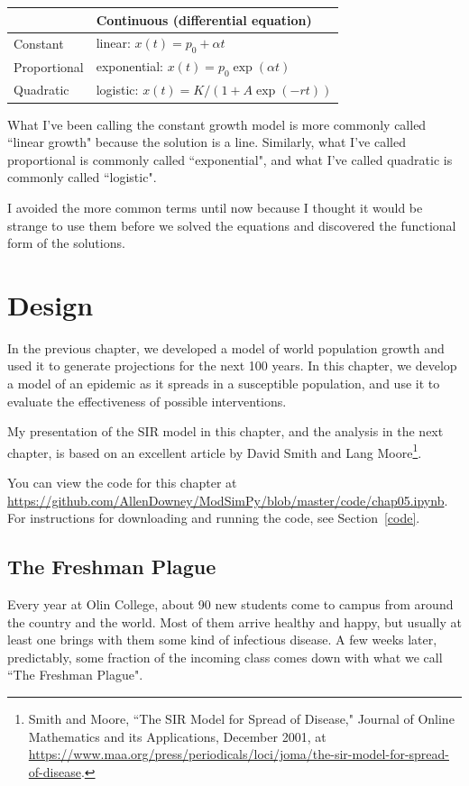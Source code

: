 \documentclass[12pt]{book}
\theoremstyle{exercise}
\begin{document}
\begin{tabular}{l|l} 
\hline
        & Continuous (differential equation) \\ 
\hline 
Constant & linear: $x(t) = p_0 + \alpha t$ \\ 
 
Proportional & exponential: $x(t) = p_0 \exp(\alpha t)$ \\ 
 
Quadratic & logistic: $x(t) = K / (1 + A\exp(-rt))$ \\ 
\end{tabular} 

What I've been calling the constant growth model is more commonly called ``linear growth" because the solution is a line.  Similarly, what I've called proportional is commonly called ``exponential", and what I've called quadratic is commonly called ``logistic".

I avoided the more common terms until now because I thought it would be strange to use them before we solved the equations and discovered the functional form of the solutions.


\chapter{Design}

In the previous chapter, we developed a model of world population growth and used it to generate projections for the next 100 years.  In this chapter, we develop a model of an epidemic as it spreads in a susceptible population, and use it to evaluate the effectiveness of possible interventions.

My presentation of the SIR model in this chapter, and the analysis in the next chapter, is based on an excellent article by David Smith and Lang Moore\footnote{Smith and Moore, ``The SIR Model for Spread of Disease," Journal of Online Mathematics and its Applications, December 2001, at \url{https://www.maa.org/press/periodicals/loci/joma/the-sir-model-for-spread-of-disease}.}.

You can view the code for this chapter at \url{https://github.com/AllenDowney/ModSimPy/blob/master/code/chap05.ipynb}.  For instructions for downloading and running the code, see Section~\ref{code}.


\section{The Freshman Plague}

Every year at Olin College, about 90 new students come to campus from around the country and the world.  Most of them arrive healthy and happy, but usually at least one brings with them some kind of infectious disease.  A few weeks later, predictably, some fraction of the incoming class comes down with what we call ``The Freshman Plague".
\end{document}
